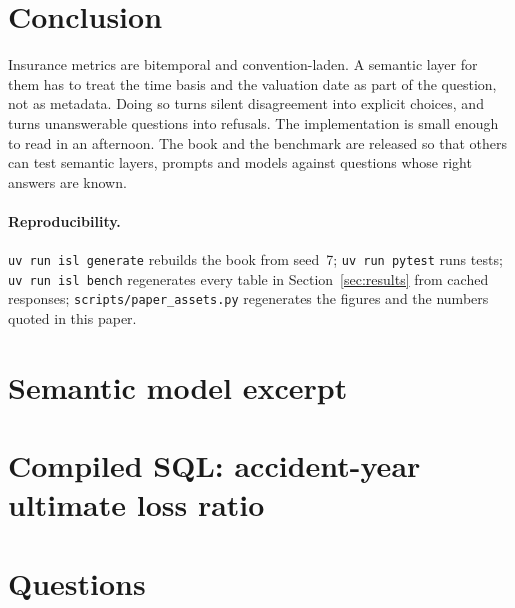 \documentclass[11pt]{article}
\begin{document}
\section{Conclusion}

Insurance metrics are bitemporal and convention-laden. A semantic layer for them has to treat the time basis and
the valuation date as part of the question, not as metadata. Doing so turns silent disagreement into explicit
choices, and turns unanswerable questions into refusals. The implementation is small enough to read in an
afternoon. The book and the benchmark are released so that others can test semantic layers, prompts and models
against questions whose right answers are known.

\paragraph{Reproducibility.}
\texttt{uv run isl generate} rebuilds the book from seed~7; \texttt{uv run pytest} runs \TestCount{} tests;
\texttt{uv run isl bench} regenerates every table in Section~\ref{sec:results} from cached responses;
\texttt{scripts/paper\_assets.py} regenerates the figures and the numbers quoted in this paper.




\appendix
\section{Semantic model excerpt}\label{app:model}


\section{Compiled SQL: accident-year ultimate loss ratio}\label{app:sql}


\section{Questions}\label{app:questions}

\end{document}
